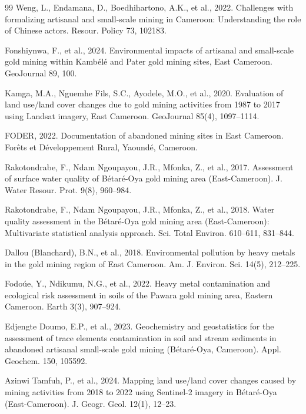 \documentclass[preprint,12pt,number]{elsarticle}
\begin{document}
\begin{thebibliography}{99}
Weng, L., Endamana, D., Boedhihartono, A.K., et al., 2022. Challenges with formalizing artisanal and small-scale mining in Cameroon: Understanding the role of Chinese actors. Resour. Policy 73, 102183.

Fonshiynwa, F., et al., 2024. Environmental impacts of artisanal and small-scale gold mining within Kamb\'{e}l\'{e} and Pater gold mining sites, East Cameroon. GeoJournal 89, 100.

Kamga, M.A., Nguemhe Fils, S.C., Ayodele, M.O., et al., 2020. Evaluation of land use/land cover changes due to gold mining activities from 1987 to 2017 using Landsat imagery, East Cameroon. GeoJournal 85(4), 1097--1114.

FODER, 2022. Documentation of abandoned mining sites in East Cameroon. For\^{e}ts et D\'{e}veloppement Rural, Yaound\'{e}, Cameroon.

Rakotondrabe, F., Ndam Ngoupayou, J.R., Mfonka, Z., et al., 2017. Assessment of surface water quality of B\'{e}tar\'{e}-Oya gold mining area (East-Cameroon). J. Water Resour. Prot. 9(8), 960--984.

Rakotondrabe, F., Ndam Ngoupayou, J.R., Mfonka, Z., et al., 2018. Water quality assessment in the B\'{e}tar\'{e}-Oya gold mining area (East-Cameroon): Multivariate statistical analysis approach. Sci. Total Environ. 610--611, 831--844.

Dallou (Blanchard), B.N., et al., 2018. Environmental pollution by heavy metals in the gold mining region of East Cameroon. Am. J. Environ. Sci. 14(5), 212--225.

Fodo\'{u}e, Y., Ndikumu, N.G., et al., 2022. Heavy metal contamination and ecological risk assessment in soils of the Pawara gold mining area, Eastern Cameroon. Earth 3(3), 907--924.

Edjengte Doumo, E.P., et al., 2023. Geochemistry and geostatistics for the assessment of trace elements contamination in soil and stream sediments in abandoned artisanal small-scale gold mining (B\'{e}tar\'{e}-Oya, Cameroon). Appl. Geochem. 150, 105592.

Azinwi Tamfuh, P., et al., 2024. Mapping land use/land cover changes caused by mining activities from 2018 to 2022 using Sentinel-2 imagery in B\'{e}tar\'{e}-Oya (East-Cameroon). J. Geogr. Geol. 12(1), 12--23.


\end{thebibliography}
\end{document}

